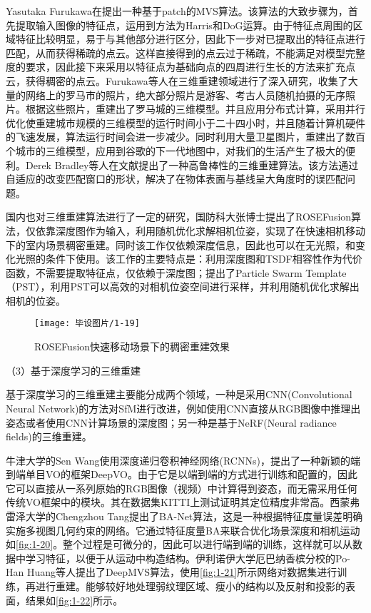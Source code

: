 Yasutaka Furukawa在提出一种基于patch的MVS\cite{Furukawa}算法。该算法的大致步骤为，首先提取输入图像的特征点，运用到方法为Harris\cite{Harris}和DoG\cite{DoG}运算。由于特征点周围的区域特征比较明显，易于与其他部分进行区分，因此下一步对已提取出的特征点进行匹配，从而获得稀疏的点云。这样直接得到的点云过于稀疏，不能满足对模型完整度的要求，因此接下来采用以特征点为基础向点的四周进行生长的方法来扩充点云，获得稠密的点云。Furukawa等人在三维重建领域进行了深入研究，收集了大量的网络上的罗马市的照片，绝大部分照片是游客、考古人员随机拍摄的无序照片。根据这些照片，重建出了罗马城的三维模型。并且应用分布式计算，采用并行优化使重建城市规模的三维模型的运行时间小于二十四小时，并且随着计算机硬件的飞速发展，算法运行时间会进一步减少。同时利用大量卫星图片，重建出了数百个城市的三维模型，应用到谷歌的下一代地图中，对我们的生活产生了极大的便利。Derek Bradley等人在文献提出了一种高鲁棒性的三维重建算法\cite{Bradley}。该方法通过自适应的改变匹配窗口的形状，解决了在物体表面与基线呈大角度时的误匹配问题。

国内也对三维重建算法进行了一定的研究，国防科大张博士提出了ROSEFusion\cite{ROSEFusion}算法，仅依靠深度图作为输入，利用随机优化求解相机位姿，实现了在快速相机移动下的室内场景稠密重建。同时该工作仅依赖深度信息，因此也可以在无光照，和变化光照的条件下使用。该工作的主要特点是：利用深度图和TSDF相容性作为代价函数，不需要提取特征点，仅依赖于深度图；提出了Particle Swarm Template（PST），利用PST可以高效的对相机位姿空间进行采样，并利用随机优化求解出相机的位姿\cite{Jiazhao}。

\begin{figure}[htbp]
    \centering
    \texttt{[image: 毕设图片/1-19]}
    \caption{\label{fig:1-19}ROSEFusion快速移动场景下的稠密重建效果\cite{ROSEFusion}}
\end{figure}

（3）基于深度学习的三维重建

基于深度学习的三维重建主要能分成两个领域，一种是采用CNN(Convolutional Neural Network)\cite{CNN}的方法对SfM进行改进，例如使用CNN直接从RGB图像中推理出姿态或者使用CNN计算场景的深度图；另一种是基于NeRF(Neural radiance fields)\cite{Nerf}的三维重建。

牛津大学的Sen Wang使用深度递归卷积神经网络(RCNNs)\cite{RCNN}，提出了一种新颖的端到端单目VO的框架DeepVO\cite{DeepVO}。由于它是以端到端的方式进行训练和配置的，因此它可以直接从一系列原始的RGB图像（视频）中计算得到姿态，而无需采用任何传统VO框架中的模块。其在数据集KITTI\cite{KITTI}上测试证明其定位精度非常高。西蒙弗雷泽大学的Chengzhou Tang提出了BA-Net\cite{BA-Net}算法，这是一种根据特征度量误差明确实施多视图几何约束的网络。它通过特征度量BA来联合优化场景深度和相机运动如\autoref{fig:1-20}。整个过程是可微分的，因此可以进行端到端的训练，这样就可以从数据中学习特征，以便于从运动中构造结构。伊利诺伊大学厄巴纳香槟分校的Po-Han Huang等人提出了DeepMVS\cite{Deepmvs}算法，使用\autoref{fig:1-21}所示网络对数据集进行训练，再进行重建。能够较好地处理弱纹理区域、瘦小的结构以及反射和投影的表面，结果如\autoref{fig:1-22}所示\cite{Po-Han}。

